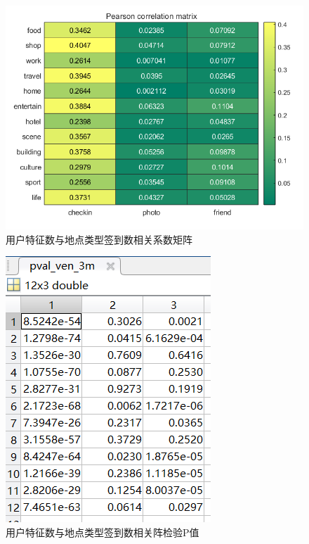 \documentclass[UTF8]{ctexart}
\begin{document}
		\begin{figure}[H]
			\centering
			\includegraphics[scale=0.6]{cor_cpf_sitetype.png}
			\caption{用户特征数与地点类型签到数相关系数矩阵}
			\label{cor_cpf_ven}
		\end{figure}
		\begin{figure}[H]
			\centering
			\includegraphics[scale=0.8]{pval_ven.png}
			\caption{用户特征数与地点类型签到数相关阵检验P值}
			\label{pval_ven}
		\end{figure}
	
\end{document}
